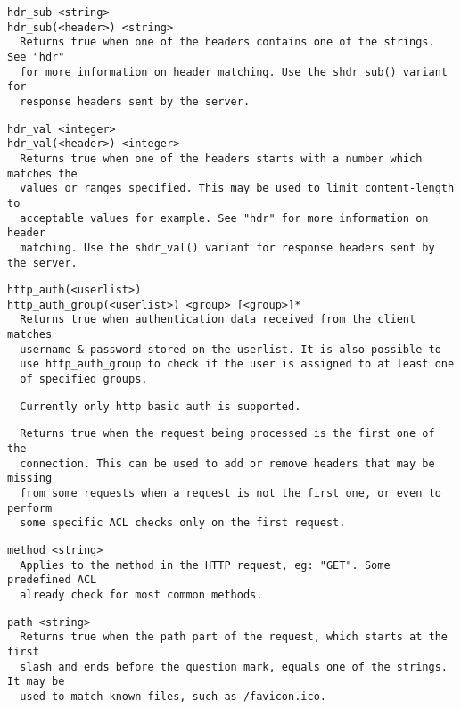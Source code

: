\begin{verbatim}
hdr_sub <string>
hdr_sub(<header>) <string>
  Returns true when one of the headers contains one of the strings. See "hdr"
  for more information on header matching. Use the shdr_sub() variant for
  response headers sent by the server.
\end{verbatim}

\begin{verbatim}
hdr_val <integer>
hdr_val(<header>) <integer>
  Returns true when one of the headers starts with a number which matches the
  values or ranges specified. This may be used to limit content-length to
  acceptable values for example. See "hdr" for more information on header
  matching. Use the shdr_val() variant for response headers sent by the server.
\end{verbatim}

\begin{verbatim}
http_auth(<userlist>)
http_auth_group(<userlist>) <group> [<group>]*
  Returns true when authentication data received from the client matches
  username & password stored on the userlist. It is also possible to
  use http_auth_group to check if the user is assigned to at least one
  of specified groups.
\end{verbatim}

\begin{verbatim}
  Currently only http basic auth is supported.
\end{verbatim}

\begin{verbatim}
  Returns true when the request being processed is the first one of the
  connection. This can be used to add or remove headers that may be missing
  from some requests when a request is not the first one, or even to perform
  some specific ACL checks only on the first request.
\end{verbatim}

\begin{verbatim}
method <string>
  Applies to the method in the HTTP request, eg: "GET". Some predefined ACL
  already check for most common methods.
\end{verbatim}

\begin{verbatim}
path <string>
  Returns true when the path part of the request, which starts at the first
  slash and ends before the question mark, equals one of the strings. It may be
  used to match known files, such as /favicon.ico.
\end{verbatim}

